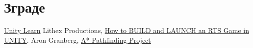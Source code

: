 \documentclass[11pt,a4paper]{report}
\begin{document}
\section{Зграде}

\begin{thebibliography}{9}
\href{https://learn.unity.com/}{Unity Learn}
   Lithex Productions, \href{https://www.youtube.com/watch?v=oVM_ugro6Mw&list=PLQPhaRCbpx5U0kcamApy727XC0v1bF0PK&index=1}{How to BUILD and LAUNCH an RTS Game in UNITY}.
Aron Granberg, \href{https://arongranberg.com/astar/front}{A* Pathfinding Project}
\end{thebibliography}
\end{document}

